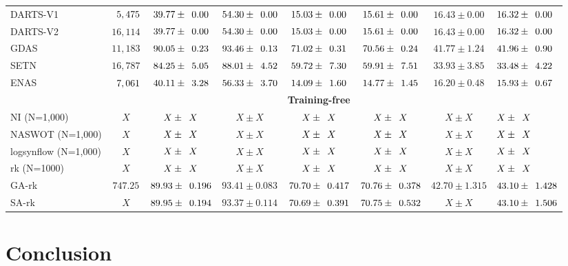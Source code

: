 \documentclass[sigconf]{acmart}
\begin{document}
\begin{table*}[htb]
\begin{tabular}{@{}lccccccl@{}}
        DARTS-V1  & $\z{5,475}$  & $39.77 \pm \z{0.00}$                & $54.30 \pm \z{0.00}$               & $15.03 \pm \z{0.00}$                 & $15.61 \pm \z{0.00}$                & $16.43 \pm 0.00$                 & $16.32 \pm \z{0.00}$                \\
        DARTS-V2  & $16,114$ & $39.77 \pm \z{0.00}$               & $54.30 \pm \z{0.00}$               & $15.03 \pm \z{0.00}$                & $15.61 \pm \z{0.00}$                   & $16.43 \pm 0.00$                 & $16.32 \pm \z{0.00}$                \\
        GDAS      & $11,183$ & $90.05 \pm \z{0.23}$                & $93.46 \pm \z{0.13}$               & $71.02 \pm \z{0.31}$                 & $70.56 \pm \z{0.24}$                & $41.77 \pm 1.24$                 & $41.96 \pm \z{0.90}$                \\
        SETN      & $16,787$ & $84.25 \pm \z{5.05}$                & $88.01 \pm \z{4.52}$               & $59.72 \pm \z{7.30}$                & $59.91 \pm \z{7.51}$                   & $33.93 \pm 3.85$                 & $33.48 \pm \z{4.22}$                \\
        ENAS      & $\z{7,061}$  & $40.11 \pm \z{3.28}$                & $56.33 \pm \z{3.70}$               & $14.09 \pm \z{1.60}$                 & $14.77 \pm \z{1.45}$                & $16.20 \pm 0.48$                 & $15.93 \pm \z{0.67}$                \\ \midrule
        &&&&\textbf{Training-free}&&&\\
        NI (N=1,000) & $X$ & $X\pm \z{X}$ & $X\pm X$ & $X\pm \z{X}$ & $X\pm \z{X}$ & $X\pm X$ & $X\pm \z{X}$ \\ 
        NASWOT (N=1,000) & $X$ & $X\pm \z{X}$ & $X\pm X$ & $X\pm \z{X}$ & $X\pm \z{X}$ & $X\pm X$ & $X\pm \z{X}$ \\ 
        logsynflow (N=1,000) & $X$ & $X\pm \z{X}$ & $X\pm X$ & $X\pm \z{X}$ & $X\pm \z{X}$ & $X\pm X$ & $X\pm \z{X}$ \\ 
        rk (N=1000) & $X$ & $X\pm \z{X}$ & $X\pm X$ & $X\pm \z{X}$ & $X\pm \z{X}$ & $X\pm X$ & $X\pm \z{X}$ \\ 
        GA-rk & $747.25$ & $89.93\pm \z{0.196}$ & $93.41\pm0.083$ & $70.70\pm \z{0.417}$ & $70.76\pm \z{0.378}$ & $42.70\pm 1.315$ & $43.10\pm \z{1.428}$ \\ 
        SA-rk & $X$ & $89.95\pm \z{0.194}$ & $93.37\pm0.114$ & $70.69\pm \z{0.391}$ & $70.75\pm \z{0.532}$ & $X\pm X$ & $43.10\pm \z{1.506}$ \\ \bottomrule
        \end{tabular}
        \label{table:overall_201}
          \vspace{-\baselineskip}
      \end{table*}
    
    \section{Conclusion}
    \label{sec:conclusion}

    
    
\end{document}
